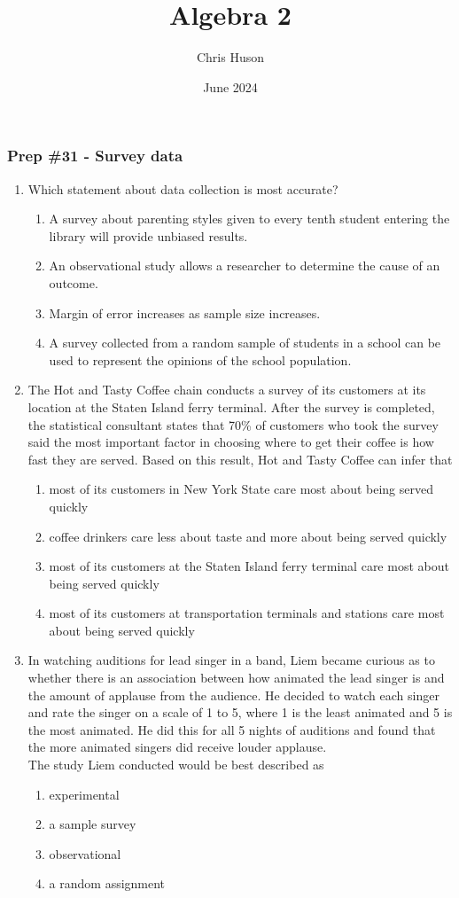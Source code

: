 \documentclass[12pt, twoside]{article}
\title{Algebra 2}
\author{Chris Huson}
\date{June 2024}
\begin{document}
\subsubsection*{Prep \#31 - Survey data}
\begin{enumerate}
\item Which statement about data collection is most accurate?
\begin{enumerate}
    \item A survey about parenting styles given to every tenth student entering the library will provide unbiased results.
    \item An observational study allows a researcher to determine the cause of an outcome.
    \item Margin of error increases as sample size increases.
    \item A survey collected from a random sample of students in a school can be used to represent the opinions of the school population.
\end{enumerate} %

\item The Hot and Tasty Coffee chain conducts a survey of its customers at its location at the Staten Island ferry terminal. After the survey is completed, the statistical consultant states that 70\% of customers who took the survey said the most important factor in choosing where to get their coffee is how fast they are served. Based on this result, Hot and Tasty Coffee can infer that
\begin{enumerate}
    \item most of its customers in New York State care most about being served quickly
    \item coffee drinkers care less about taste and more about being served quickly
    \item most of its customers at the Staten Island ferry terminal care most about being served quickly
    \item most of its customers at transportation terminals and stations care most about being served quickly
\end{enumerate} %

\item In watching auditions for lead singer in a band, Liem became curious as to whether there is an association between how animated the lead singer is and the amount of applause from the audience. He decided to watch each singer and rate the singer on a scale of 1 to 5, where 1 is the least animated and 5 is the most animated. He did this for all 5 nights of auditions and found that the more animated singers did receive louder applause. \\[0.25cm]
The study Liem conducted would be best described as %
\begin{enumerate}
    \item experimental
    \item a sample survey
    \item observational
    \item a random assignment
\end{enumerate}



\end{enumerate}
\end{document}
